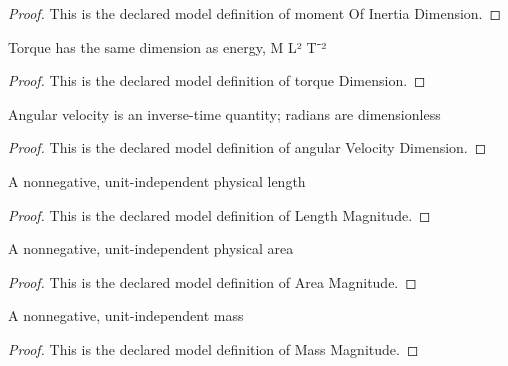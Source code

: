 \begin{proof}
  This is the declared model definition of moment Of Inertia Dimension.
\end{proof}
\begin{definition}
  \label{def:physics:phyx-mini-0954:phyxminiproblems-problemphyxmini0954-torquedimension}
  Torque has the same dimension as energy, M L² T⁻²
\end{definition}
\begin{proof}
  This is the declared model definition of torque Dimension.
\end{proof}
\begin{definition}
  \label{def:physics:phyx-mini-0954:phyxminiproblems-problemphyxmini0954-angularvelocitydimension}
  Angular velocity is an inverse-time quantity; radians are dimensionless
\end{definition}
\begin{proof}
  This is the declared model definition of angular Velocity Dimension.
\end{proof}
\begin{definition}
  \label{def:physics:phyx-mini-0954:phyxminiproblems-problemphyxmini0954-lengthmagnitude}
  A nonnegative, unit-independent physical length
\end{definition}
\begin{proof}
  This is the declared model definition of Length Magnitude.
\end{proof}
\begin{definition}
  \label{def:physics:phyx-mini-0954:phyxminiproblems-problemphyxmini0954-areamagnitude}
  A nonnegative, unit-independent physical area
\end{definition}
\begin{proof}
  This is the declared model definition of Area Magnitude.
\end{proof}
\begin{definition}
  \label{def:physics:phyx-mini-0954:phyxminiproblems-problemphyxmini0954-massmagnitude}
  A nonnegative, unit-independent mass
\end{definition}
\begin{proof}
  This is the declared model definition of Mass Magnitude.
\end{proof}
